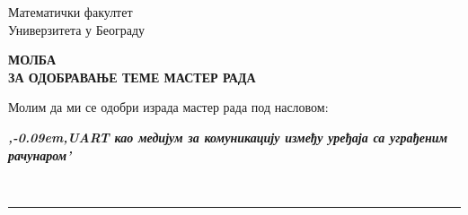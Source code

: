 \documentclass[a4paper]{article}
\def\zn{,\kern-0.09em,}
\begin{document}
\thispagestyle{empty}

\begin{flushleft}
Математички факултет\\
Универзитета у Београду
\end{flushleft}

\bigskip

\begin{center}
\textbf{МОЛБА\\
ЗА ОДОБРАВАЊЕ ТЕМЕ МАСТЕР РАДА
}\end{center}

\bigskip

\begin{flushleft}
Молим да ми се одобри израда мастер рада под насловом:
\end{flushleft}

\begin{minipage}{16.5cm}
\textbf{\textit{\zn UART као медијум за комуникацију између уређаја са уграђеним рачунаром'}}
\end{minipage}\\
\rule[4mm]{17.5cm}{.05mm}
\end{document}
